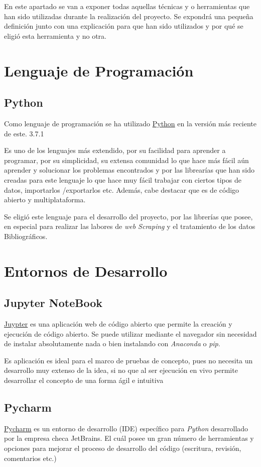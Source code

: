 
En este apartado se van a exponer todas aquellas técnicas y o herramientas que han sido utilizadas durante la realización del proyecto. Se expondrá una pequeña definición junto con una explicación para que han sido utilizados y por qué se eligió esta herramienta y no otra.

\section{Lenguaje de Programación}
\subsection{Python}
Como lenguaje de programación se ha utilizado \href {https://www.python.org/}{Python} en la versión más reciente de este. 3.7.1

Es uno de los lenguajes más extendido, por su facilidad para aprender a programar, por su simplicidad, su extensa comunidad lo que hace más fácil aún aprender y solucionar los problemas encontrados y por las librearías que han sido creadas para este lenguaje lo que hace muy fácil trabajar con ciertos tipos de datos, importarlos /exportarlos etc. Además, cabe destacar que es de código abierto y multiplataforma.

Se eligió este lenguaje para el desarrollo del proyecto, por las librerías que posee, en especial para realizar las labores de \emph{web Scraping} y el tratamiento de los datos Bibliográficos.

\section{Entornos de Desarrollo}
\subsection{Jupyter NoteBook}
\href{https://jupyter.org/}{Juypter} es una aplicación web de código abierto que permite la creación y ejecución de código abierto. Se puede utilizar mediante el navegador sin necesidad de instalar absolutamente nada o bien instalando con \emph{Anaconda} o \emph{pip}.

Es aplicación es ideal para el marco de pruebas de concepto, pues no necesita un desarrollo muy extenso de la idea, si no que al ser ejecución en vivo permite desarrollar el concepto de una forma ágil e intuitiva

\subsection{Pycharm}
\href {https://www.jetbrains.com/pycharm/}{Pycharm} es un entorno de desarrollo (IDE) específico para \emph{Python} desarrollado por la empresa checa JetBrains. El cuál posee un gran número de herramientas y opciones para mejorar el proceso de desarrollo del código (escritura, revisión, comentarios etc.)

